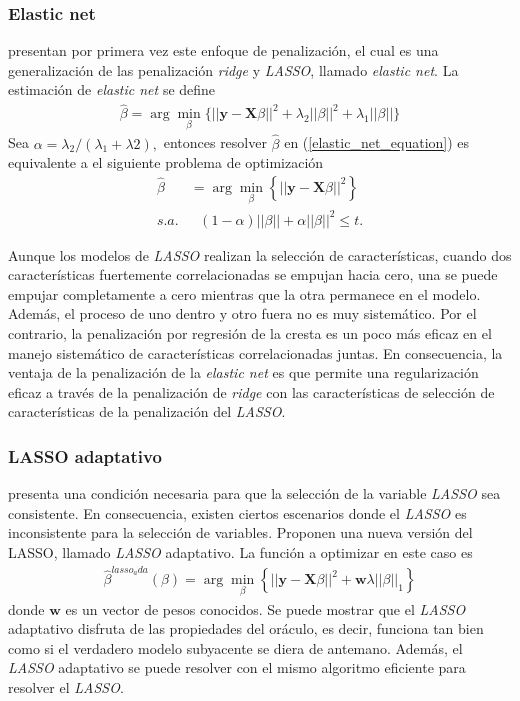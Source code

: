 \documentclass{article}
\newcommand{\X}{\mathbf{X}}
\newcommand{\y}{\mathbf{y}}
\newcommand{\w}{\mathbf{w}}
\begin{document}
\subsubsection{Elastic net}
\cite{elastic_net} presentan por primera vez este enfoque de penalización, el cual es una generalización de las penalización \textit{ridge} y \textit{LASSO}, llamado \textit{elastic net}. La estimación de \textit{elastic net} se define 
\begin{align}\label{elastic_net_equation}
    \hat{\beta} = \arg \min_{\beta} \{||\y-\X \beta ||^2+\lambda_2||\beta||^2+\lambda_1||\beta||\}
\end{align}
Sea $\alpha = \lambda_2/(\lambda_1+\lambda2),$ entonces resolver $\hat{\beta}$ en (\ref{elastic_net_equation}) es equivalente a el siguiente problema de optimización
\begin{align}
    \hat{\beta} &= \arg \min_{\beta} \left\{ ||\y-\X\beta||^2 \right\}\\
    s.a. &\ \ \ (1-\alpha)||\beta||+\alpha||\beta||^2\leq t.
\end{align}

Aunque los modelos de \textit{LASSO} realizan la selección de características, cuando dos características fuertemente correlacionadas se empujan hacia cero, una se puede empujar completamente a cero mientras que la otra permanece en el modelo. Además, el proceso de uno dentro y otro fuera no es muy sistemático. Por el contrario, la penalización por regresión de la cresta es un poco más eficaz en el manejo sistemático de características correlacionadas juntas. En consecuencia, la ventaja de la penalización de la \textit{elastic net} es que permite una regularización eficaz a través de la penalización de \textit{ridge} con las características de selección de características de la penalización del \textit{LASSO}.

\subsubsection{LASSO adaptativo}
\cite{lasso_adaptative} presenta una condición necesaria para que la selección de la variable \textit{LASSO} sea consistente. En consecuencia, existen ciertos escenarios donde el \textit{LASSO} es inconsistente para la selección de variables. Proponen una nueva versión del LASSO, llamado \textit{LASSO} adaptativo. La función a optimizar en este caso es
\begin{align} \label{lasso_adaptatico_equation}
\hat{\beta}^{lasso_ada}(\beta) = \arg \min_{\beta} \left\{||\y- \X \beta||^2+\w\lambda||\beta||_1 \right\}
\end{align}
donde $\w$ es un vector de pesos conocidos. Se puede mostrar que el \textit{LASSO} adaptativo disfruta de las propiedades del oráculo, es decir, funciona tan bien como si el verdadero modelo subyacente se diera de antemano. Además, el \textit{LASSO} adaptativo se puede resolver con el mismo algoritmo eficiente para resolver el \textit{LASSO}.
\end{document}
